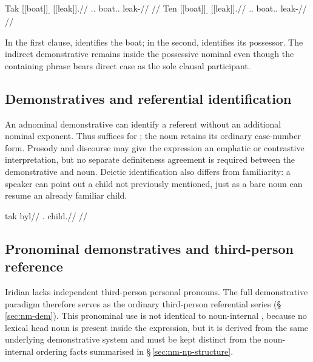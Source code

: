 \pex\label{ex:nm-slot-demonstrative-ownership}
\a
\begingl
\gla Tak \textnormal{[[boat]]}\textsubscript{\Dir{}.\Sg{}} \textnormal{[[leak]]}\textsubscript{\Prog{}}.//
\glb \Dem{}.\Prox{}.\Dir{} boat.\Dir{}.\Sg{} leak-\Prog{}//
\glft {} //
\endgl
\a
\begingl
\gla Ten \textnormal{[[boat]]}\textsubscript{\Dir{}.\Sg{}} \textnormal{[[leak]]}\textsubscript{\Prog{}}.//
\glb \Dem{}.\Prox{}.\Ind{} boat.\Dir{}.\Sg{} leak-\Prog{}//
\glft {} //
\endgl
\xe

In the first clause,  identifies the boat; in the second,
 identifies its possessor. The indirect demonstrative remains
inside the possessive nominal even though the containing phrase bears
direct case as the sole clausal participant.

\subsection{Demonstratives and referential identification}
\label{sec:nm-dem-reference}

An adnominal demonstrative can identify a referent without an additional
nominal exponent. Thus  suffices for ; the
noun retains its ordinary case-number form. Prosody and discourse may give
the expression an emphatic or contrastive interpretation, but no separate
definiteness agreement is required between the demonstrative and noun.
Deictic identification also differs from familiarity: a speaker can point
out a child not previously mentioned, just as a bare noun can resume an
already familiar child.

\ex
\begingl
\gla tak byl//
\glb \Dem{}.\Prox{} child.\Dir{}//
\glft {}//
\endgl
\xe

\subsection{Pronominal demonstratives and third-person reference}
\label{sec:nm-dem-pron}

Iridian lacks independent third-person personal pronouns. The full demonstrative
paradigm therefore serves as the ordinary third-person referential series
(§\,\ref{sec:nm-dem}). This pronominal use is not identical to noun-internal
, because no lexical head noun is present inside the expression,
but it is derived from the same underlying demonstrative system and must be kept
distinct from the noun-internal ordering facts summarised in
§\,\ref{sec:nm-np-structure}.

